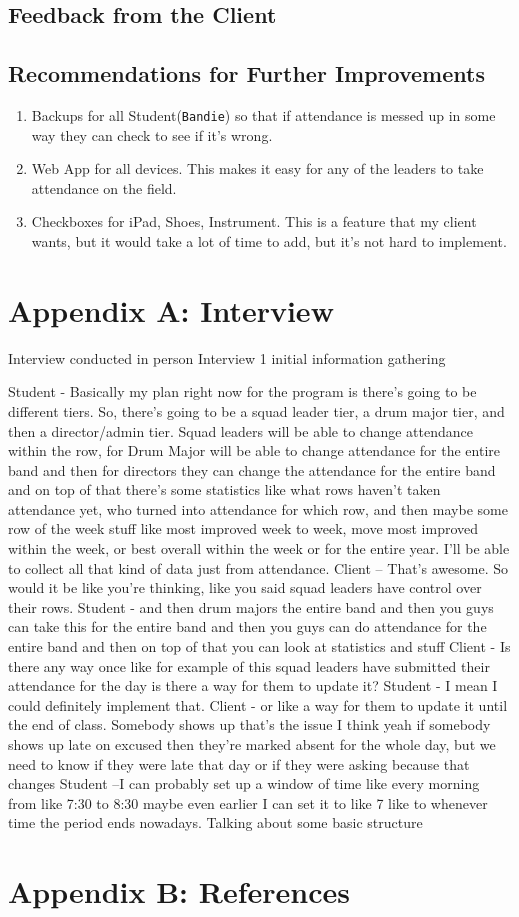 \documentclass{article}
\begin{document}
\subsection{Feedback from the Client}
\subsection{Recommendations for Further Improvements}
\begin{enumerate}
	\item Backups for all Student(\verb|Bandie|) so that if attendance is messed up in some way they can check to see if it's wrong.
	\item Web App for all devices. This makes it easy for any of the leaders to take attendance on the field.
	\item Checkboxes for iPad, Shoes, Instrument. This is a feature that my client wants, but it would take a lot of time to add, but it's not hard to implement.
\end{enumerate}
\newpage
\section{Appendix A: Interview}
Interview conducted in person
Interview 1 initial information gathering

Student - Basically my plan right now for the program is there's going to be different tiers. So, there’s going to be a squad leader tier, a drum major tier, and then a director/admin tier. Squad leaders will be able to change attendance within the row, for Drum Major will be able to change attendance for the entire band and then for directors they can change the attendance for the entire band and on top of that there's some statistics like what rows haven't taken attendance yet, who turned into attendance for which row, and then maybe some row of the week stuff like most improved week to week, move most improved within the week, or best overall within the week or for the entire year. I’ll be able to collect all that kind of data just from attendance.
Client – That’s awesome. So would it be like you're thinking, like you said squad leaders have control over their rows. 
Student - and then drum majors the entire band and then you guys can take this for the entire band and then you guys can do attendance for the entire band and then on top of that you can look at statistics and stuff
Client - Is there any way once like for example of this squad leaders have submitted their attendance for the day is there a way for them to update it?
Student - I mean I could definitely implement that.
Client - or like a way for them to update it until the end of class. Somebody shows up that's the issue I think yeah if somebody shows up late on excused then they're marked absent for the whole day, but we need to know if they were late that day or if they were asking because that changes 
Student –I can probably set up a window of time like every morning from like 7:30 to 8:30 maybe even earlier I can set it to like 7 like to whenever time the period ends nowadays. Talking about some basic structure %
\newpage
\section{Appendix B: References}
{}

\end{document}
